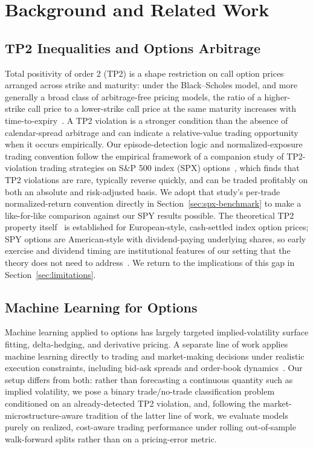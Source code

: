 \documentclass[sigconf,review,anonymous]{acmart}
\begin{document}
\section{Background and Related Work}
\label{sec:related}

\subsection{TP2 Inequalities and Options Arbitrage}
Total positivity of order 2 (TP2) is a shape restriction on call option prices arranged across strike and maturity: under the Black--Scholes model, and more generally a broad class of arbitrage-free pricing models, the ratio of a higher-strike call price to a lower-strike call price at the same maturity increases with time-to-expiry~\cite{glasserman2026tp2theory,glasserman2023convexity}. A TP2 violation is a stronger condition than the absence of calendar-spread arbitrage and can indicate a relative-value trading opportunity when it occurs empirically. Our episode-detection logic and normalized-exposure trading convention follow the empirical framework of a companion study of TP2-violation trading strategies on S\&P 500 index (SPX) options~\cite{glasserman2025tp2}, which finds that TP2 violations are rare, typically reverse quickly, and can be traded profitably on both an absolute and risk-adjusted basis. We adopt that study's per-trade normalized-return convention directly in Section~\ref{sec:spx-benchmark} to make a like-for-like comparison against our SPY results possible. The theoretical TP2 property itself~\cite{glasserman2026tp2theory} is established for European-style, cash-settled index option prices; SPY options are American-style with dividend-paying underlying shares, so early exercise and dividend timing are institutional features of our setting that the theory does not need to address~\cite{cosma2020earlyexercise}. We return to the implications of this gap in Section~\ref{sec:limitations}.

\subsection{Machine Learning for Options}
Machine learning applied to options has largely targeted implied-volatility surface fitting, delta-hedging, and derivative pricing. A separate line of work applies machine learning directly to trading and market-making decisions under realistic execution constraints, including bid-ask spreads and order-book dynamics~\cite{kearns2013mlmicrostructure}. Our setup differs from both: rather than forecasting a continuous quantity such as implied volatility, we pose a binary trade/no-trade classification problem conditioned on an already-detected TP2 violation, and, following the market-microstructure-aware tradition of the latter line of work, we evaluate models purely on realized, cost-aware trading performance under rolling out-of-sample walk-forward splits rather than on a pricing-error metric.
\end{document}

